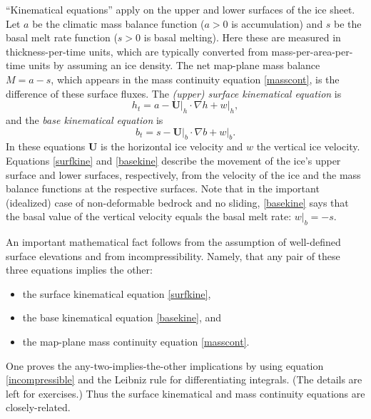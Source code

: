 \documentclass[letterpaper,final,12pt,reqno]{amsart}
\newcommand{\grad}{\nabla}
\begin{document}
``Kinematical equations'' apply on the upper and lower surfaces of the ice sheet.  Let $a$ be the climatic mass balance function ($a>0$ is accumulation) and $s$ be the basal melt rate function ($s>0$ is basal melting).  Here these are measured in thickness-per-time units, which are typically converted from mass-per-area-per-time units by assuming an ice density.  The net map-plane mass balance $M=a-s$, which appears in the mass continuity equation \eqref{masscont}, is the difference of these surface fluxes.  The \emph{(upper) surface kinematical equation} is 
\begin{equation}
h_t = a - \mathbf{U}\big|_h \cdot \grad h + w\big|_h,  \label{surfkine}
\end{equation}
and the \emph{base kinematical equation} is
\begin{equation}
b_t = s - \mathbf{U}\big|_b \cdot \grad b + w\big|_b.  \label{basekine}
\end{equation}
In these equations $\mathbf{U}$ is the horizontal ice velocity and $w$ the vertical ice velocity.  Equations \eqref{surfkine} and \eqref{basekine} describe the movement of the ice's upper surface and lower surfaces, respectively, from the velocity of the ice and the mass balance functions at the respective surfaces.  Note that in the important (idealized) case of non-deformable bedrock and no sliding, \eqref{basekine} says that the basal value of the vertical velocity equals the basal melt rate: $w\big|_b=-s$.

An important mathematical fact follows from the assumption of well-defined surface elevations and from incompressibility.  Namely, that any pair of these three equations implies the other:
  \begin{itemize}
  \item the surface kinematical equation \eqref{surfkine},
  \item the base kinematical equation \eqref{basekine}, and
  \item the map-plane mass continuity equation \eqref{masscont}.
  \end{itemize}
One proves the any-two-implies-the-other implications by using equation \eqref{incompressible} and the Leibniz rule for differentiating integrals.  (The details are left for exercises.)  Thus the surface kinematical and mass continuity equations are closely-related.
\end{document}
